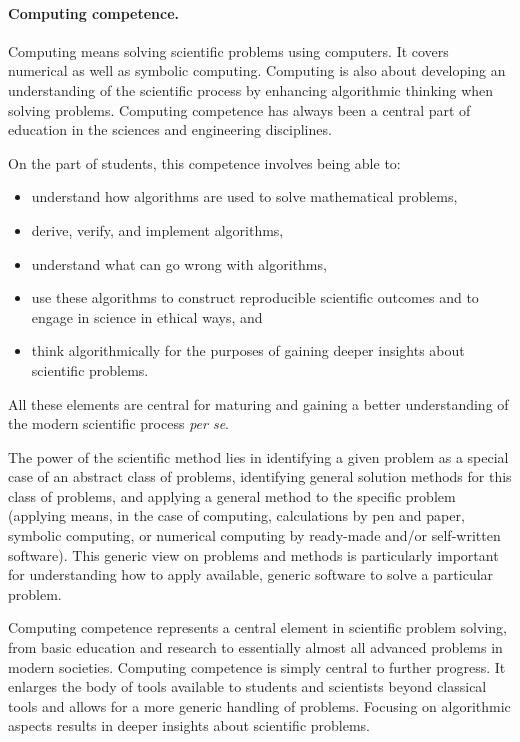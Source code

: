 \documentclass[%
oneside,                 %
final,                   %
10pt]{article}
\begin{document}
\paragraph{Computing competence.}
Computing means solving scientific problems using computers. It covers
numerical as well as symbolic computing. Computing is also about
developing an understanding of the scientific process by enhancing
algorithmic thinking when solving problems.  Computing competence has
always been a central part of education in the sciences and engineering disciplines.

On the part of students, this competence involves being able to:

\begin{itemize}
\item understand how algorithms are used to solve mathematical problems,

\item derive, verify, and implement algorithms,

\item understand what can go wrong with algorithms,

\item use these algorithms to construct reproducible scientific outcomes and to engage in science in ethical ways, and

\item think algorithmically for the purposes of gaining deeper insights about scientific problems.
\end{itemize}

\noindent
All these elements are central for maturing and gaining a better understanding of the modern scientific process \emph{per se}.

The power of the scientific method lies in identifying a given problem
as a special case of an abstract class of problems, identifying
general solution methods for this class of problems, and applying a
general method to the specific problem (applying means, in the case of
computing, calculations by pen and paper, symbolic computing, or
numerical computing by ready-made and/or self-written software). This
generic view on problems and methods is particularly important for
understanding how to apply available, generic software to solve a
particular problem.

Computing competence represents a central element
in scientific problem solving, from basic education and research to
essentially almost all advanced problems in modern
societies. Computing competence is simply central to further
progress. It enlarges the body of tools available to students and
scientists beyond classical tools and allows for a more generic
handling of problems. Focusing on algorithmic aspects results in
deeper insights about scientific problems.
\end{document}
